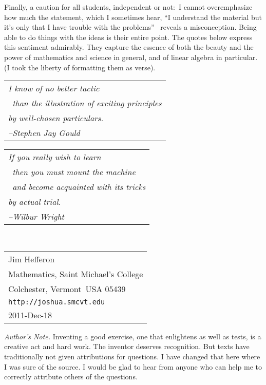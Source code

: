 \bigskip
Finally, a caution for all students, independent or not:~I 
cannot overemphasize how much the 
statement, which I sometimes hear, ``I understand the material but it's only 
that I have trouble with the problems''\ %
reveals a misconception.
Being able to do things with the ideas is their entire point.
The quotes below express this sentiment admirably.
They capture the essence of both the beauty and the power
of mathematics and science in general, 
and of linear algebra in particular.
(I took the liberty of formatting them as verse).

\bigskip
\par\noindent\begin{tabular}[t]{@{}l@{}}
  \textit{I know of no better tactic}                     \\
  \textit{\ than the illustration of exciting principles} \\
  \textit{by well-chosen particulars.}                    \\
  \hspace*{1in}\textit{--Stephen Jay Gould}
\end{tabular}

\bigskip
\par\noindent
\begin{tabular}[t]{@{}l@{}}   
\textit{If you really wish to learn}                     \\
   \textit{\ then you must mount the machine}  \\ 
   \textit{\ and become acquainted with its tricks} \\
   \textit{by actual trial.}                    \\
   \hspace*{1in}\textit{--Wilbur Wright}
\end{tabular}

\par\ \hfill\begin{tabular}[t]{@{}l@{}}
                       Jim Hef{}feron            \\
                       Mathematics, Saint Michael's College \\ 
                       Colchester, Vermont\ USA 05439  \\     
                       \texttt{http://joshua.smcvt.edu} \\
                       2011-Dec-18
                    \end{tabular}

\vfill
\par\noindent\textit{Author's Note.}
Inventing a good exercise, one that enlightens as well as tests, 
is a creative act and hard work.
The inventor deserves recognition.
But texts have traditionally not given attributions for
questions.
I have changed that here where I was sure of the source.
I would be glad to hear from anyone who can help me to correctly
attribute others of the questions.   

